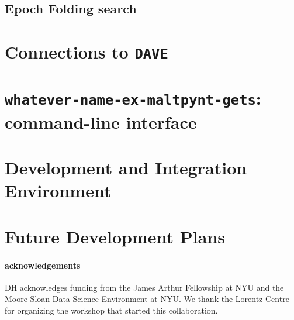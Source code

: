 \documentclass[12pt]{emulateapj}
\newcommand{\maltpynt}{\texttt{whatever-name-ex-maltpynt-gets}\xspace}
\begin{document}
\subsection{Epoch Folding search}


\section{Connections to \texttt{DAVE}}
\label{sec:dave}

\section{\maltpynt: command-line interface}
\label{sec:maltpynt}


\section{Development and Integration Environment}
\label{sec:development}

\section{Future Development Plans}
\label{sec:future}

\paragraph{acknowledgements}
DH acknowledges funding from the James Arthur Fellowship at NYU and the Moore-Sloan Data Science Environment at NYU. 
We thank the Lorentz Centre for organizing the workshop that started this collaboration.
\clearpage



\end{document}

